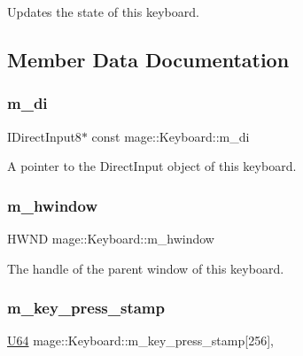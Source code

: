 Updates the state of this keyboard. 

\subsection{Member Data Documentation}
\hypertarget{classmage_1_1_keyboard_a627eeef05bae81a60c2c44fd039ff7f8}{}\label{classmage_1_1_keyboard_a627eeef05bae81a60c2c44fd039ff7f8} 
\subsubsection{\texorpdfstring{m\+\_\+di}{m\_di}}
{\footnotesize\ttfamily I\+Direct\+Input8$\ast$ const mage\+::\+Keyboard\+::m\+\_\+di\hspace{0.3cm}{\ttfamily [private]}}

A pointer to the Direct\+Input object of this keyboard. \hypertarget{classmage_1_1_keyboard_aa7196c689dad6f5aaf35e3929de02791}{}\label{classmage_1_1_keyboard_aa7196c689dad6f5aaf35e3929de02791} 
\subsubsection{\texorpdfstring{m\+\_\+hwindow}{m\_hwindow}}
{\footnotesize\ttfamily H\+W\+ND mage\+::\+Keyboard\+::m\+\_\+hwindow\hspace{0.3cm}{\ttfamily [private]}}

The handle of the parent window of this keyboard. \hypertarget{classmage_1_1_keyboard_a4a9e80f99dfea8ac518fb451965d4047}{}\label{classmage_1_1_keyboard_a4a9e80f99dfea8ac518fb451965d4047} 
\subsubsection{\texorpdfstring{m\+\_\+key\+\_\+press\+\_\+stamp}{m\_key\_press\_stamp}}
{\footnotesize\ttfamily \hyperlink{namespacemage_a6672cf3c861707ce4a3235a3eb43941d}{U64} mage\+::\+Keyboard\+::m\+\_\+key\+\_\+press\+\_\+stamp\mbox{[}256\mbox{]}\hspace{0.3cm}{\ttfamily [mutable]}, {\ttfamily [private]}}


